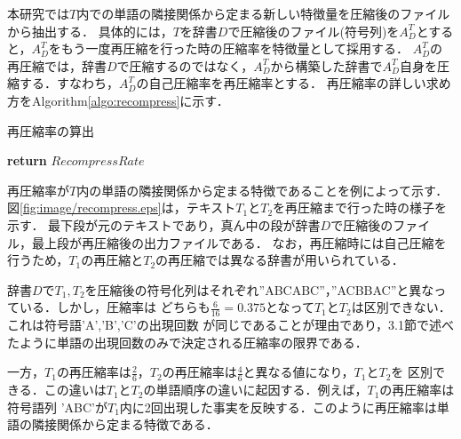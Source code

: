 本研究では$T$内での単語の隣接関係から定まる新しい特徴量を圧縮後のファイルから抽出する．
具体的には，$T$を辞書$D$で圧縮後のファイル(符号列)を$A^T_D$とすると，$A^T_D$をもう一度再圧縮を行った時の圧縮率を特徴量として採用する．
$A^T_D$の再圧縮では，辞書$D$で圧縮するのではなく，$A^T_D$から構築した辞書で$A^T_D$自身を圧縮する．すなわち，$A^T_D$の自己圧縮率を再圧縮率とする．
再圧縮率の詳しい求め方をAlgorithm\ref{algo:recompress}に示す．
\begin{algorithm}[tb]
\caption{再圧縮率の算出}\label{algo:recompress}
\begin{algorithmic}[1]
\EndIf
{}
\Else
{}
\EndIf
\EndFor
{}
\EndIf
{}
\State \textbf{return} $RecompressRate$
\EndProcedure
\end{algorithmic}
\end{algorithm}


再圧縮率が$T$内の単語の隣接関係から定まる特徴であることを例によって示す．
図\ref{fig:image/recompress.eps}は，テキスト$T_1$と$T_2$を再圧縮まで行った時の様子を示す．
最下段が元のテキストであり，真ん中の段が辞書$D$で圧縮後のファイル，最上段が再圧縮後の出力ファイルである．
なお，再圧縮時には自己圧縮を行うため，$T_1$の再圧縮と$T_2$の再圧縮では異なる辞書が用いられている．

辞書$D$で$T_1,T_2$を圧縮後の符号化列はそれぞれ''ABCABC''，''ACBBAC''と異なっている．しかし，圧縮率は
どちらも$\frac{6}{16}=0.375$となって$T_1$と$T_2$は区別できない．これは符号語'A','B','C'の出現回数
が同じであることが理由であり，3.1節で述べたように単語の出現回数のみで決定される圧縮率の限界である．

一方，$T_1$の再圧縮率は$\frac{2}{6}$，$T_2$の再圧縮率は$\frac{4}{6}$と異なる値になり，$T_1$と$T_2$を
区別できる．この違いは$T_1$と$T_2$の単語順序の違いに起因する．例えば，$T_1$の再圧縮率は符号語列
'ABC'が$T_1$内に2回出現した事実を反映する．このように再圧縮率は単語の隣接関係から定まる特徴である．

